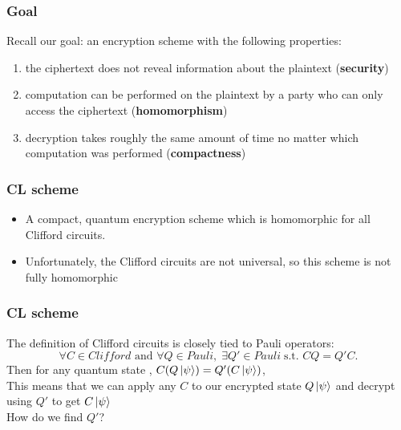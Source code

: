 

\begin{frame}
\frametitle{Goal}
  Recall our goal: an encryption scheme with the following properties: \pause
    \begin{enumerate}
    \item the ciphertext does not reveal information about the plaintext (\textbf{security}) \pause
    \item computation can be performed on the plaintext by a party who can only access the ciphertext (\textbf{homomorphism}) \pause
    \item decryption takes roughly the same amount of time no matter which computation was performed (\textbf{compactness}) 
   \end{enumerate}
\end{frame}

\begin{frame}
\frametitle{CL scheme}
\begin{itemize} 
  \item A compact, quantum encryption scheme which is homomorphic for all Clifford circuits. \pause
  \item Unfortunately, the Clifford circuits are not universal, so this scheme is not fully homomorphic
\end{itemize}
\end{frame}
 
\begin{frame}
\frametitle{CL scheme}
The definition of Clifford circuits is closely tied to Pauli operators: 
\[ \forall C \in Clifford \text{ and } \forall Q \in Pauli, \; \exists Q' \in Pauli \; \text{s.t.  } CQ = Q'C. 
\]
\pause
Then for any quantum state \ket{\psi},  $C(Q\left\vert{\psi}\right\rangle) = Q'(C\left\vert{\psi}\right\rangle)$, \\ \pause
\vspace*{5mm}
This means that we can apply any $C$ to our encrypted state $Q\left\vert{\psi}\right\rangle$ and decrypt using $Q'$ to get $C\left\vert{\psi}\right\rangle$\\ \pause
\vspace*{5mm}
How do we find $Q'$?
\end{frame}

